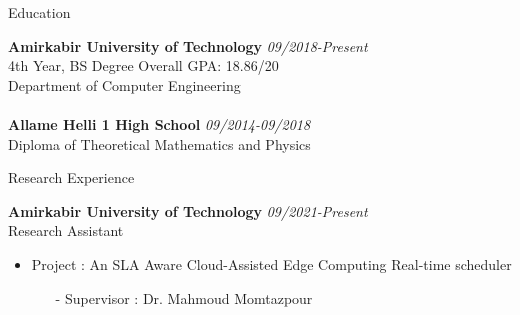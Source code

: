 \documentclass{resume} %
\begin{document}

\begin{rSection}{Education}

    {\bf Amirkabir University of Technology} \hfill {\em 09/2018-Present} 
    \\ 4th Year, BS Degree \hfill { Overall GPA: 18.86/20}
    \\ Department of Computer Engineering
    \\
    \\{\bf Allame Helli 1 High School} \hfill {\em 09/2014-09/2018} 
    \\ Diploma of Theoretical Mathematics and Physics
    \\


\end{rSection}
\begin{rSection}{Research Experience}

    {\bf Amirkabir University of Technology} \hfill {\em 09/2021-Present} 
    \\ Research Assistant
\item 
    \begin{itemize}
        \item
            Project : An SLA Aware Cloud-Assisted Edge Computing Real-time scheduler
            \begin{itemize}
                \item[-]
                    Supervisor : Dr. Mahmoud Momtazpour
            \end{itemize}
    \end{itemize}
\end{rSection}
\end{document}
